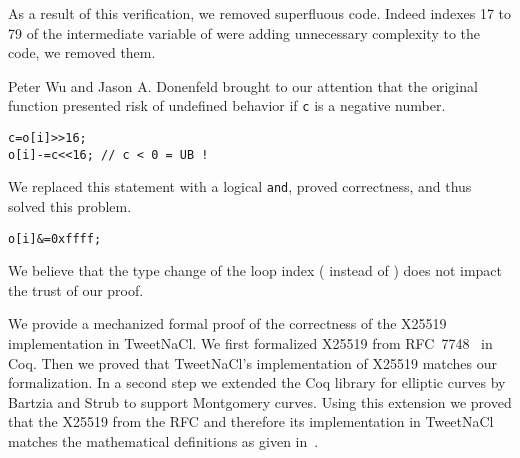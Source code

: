 As a result of this verification, we removed superfluous code.
Indeed indexes 17 to 79 of the  intermediate variable of
 were adding unnecessary complexity to the code,
we removed them.

Peter Wu and Jason A. Donenfeld brought to our attention that the original
 function presented risk of undefined behavior if \texttt{c}
is a negative number.
\begin{lstlisting}[language=Ctweetnacl]
c=o[i]>>16;
o[i]-=c<<16; // c < 0 = UB !
\end{lstlisting}
We replaced this statement with a logical \texttt{and}, proved correctness,
and thus solved this problem.
\begin{lstlisting}[language=Ctweetnacl]
o[i]&=0xffff;
\end{lstlisting}

We believe that the type change of the loop index ( instead of )
does not impact the trust of our proof.

We provide a mechanized formal proof of the correctness of the X25519
implementation in TweetNaCl.
We first formalized X25519 from RFC~7748~\cite{rfc7748} in Coq. Then we proved
that TweetNaCl's implementation of X25519 matches our formalization.
In a second step we extended the Coq library for elliptic curves \cite{BartziaS14}
by Bartzia and Strub to support Montgomery curves. Using this extension we
proved that the X25519 from the RFC and therefore its implementation in TweetNaCl matches
the mathematical definitions as given in~\cite[Sec.~2]{Ber06}.
